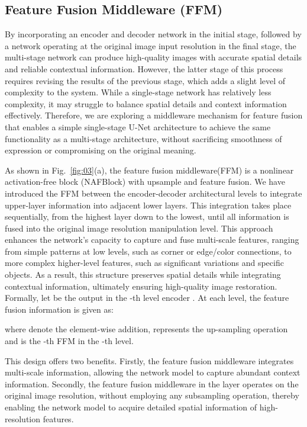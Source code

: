 \documentclass[sn-mathphys,Numbered]{sn-jnl}
\theoremstyle{thmstyleone}\newtheorem{theorem}{Theorem}\newtheorem{proposition}[theorem]{Proposition}
\theoremstyle{thmstyletwo}\newtheorem{example}{Example}\newtheorem{remark}{Remark}
\theoremstyle{thmstylethree}\newtheorem{definition}{Definition}
\begin{document}
\subsection{Feature Fusion Middleware (FFM)}
By incorporating an encoder and decoder network in the initial stage, followed by a network operating at the original image input resolution in the final stage, the multi-stage network can produce high-quality images with accurate spatial details and reliable contextual information. However, the latter stage of this process requires revising the results of the previous stage, which adds a slight level of complexity to the system. While a single-stage network has relatively less complexity, it may struggle to balance spatial details and context information effectively. Therefore, we are exploring a middleware mechanism for feature fusion that enables a simple single-stage U-Net architecture to achieve the same functionality as a multi-stage architecture, without sacrificing smoothness of expression or compromising on the original meaning.


As shown in Fig.~\ref{fig:03}(a), the feature fusion middleware(FFM) is a  nonlinear activation-free block (NAFBlock) with upsample and feature fusion. We have introduced the FFM between the encoder-decoder architectural levels to integrate upper-layer information into adjacent lower layers. This integration takes place sequentially, from the highest layer down to the lowest, until all information is fused into the original image resolution manipulation level. This approach enhances the network's capacity to capture and fuse multi-scale features, ranging from simple patterns at low levels, such as corner or edge/color connections, to more complex higher-level features, such as significant variations and specific objects. As a result, this structure preserves spatial details while integrating contextual information, ultimately ensuring high-quality image restoration. Formally, let   be the output in the -th level encoder . At each level, the feature fusion information  is given as:


where  denote the element-wise addition,  represents the up-sampling operation and  is the -th FFM in the -th level. 

This design offers two benefits. Firstly, the feature fusion middleware integrates multi-scale information, allowing the network model to capture abundant context information. Secondly, the feature fusion middleware in the  layer operates on the original image resolution, without employing any subsampling operation, thereby enabling the network model to acquire detailed spatial information of high-resolution features.
\end{document}
